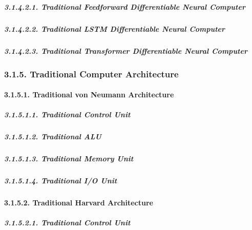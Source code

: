\documentclass[
]{article}
\begin{document}
\hypertarget{traditional-feedforward-differentiable-neural-computer-1}{%
\subparagraph{3.1.4.2.1. Traditional Feedforward Differentiable Neural
Computer}\label{traditional-feedforward-differentiable-neural-computer-1}}

\hypertarget{traditional-lstm-differentiable-neural-computer-1}{%
\subparagraph{3.1.4.2.2. Traditional LSTM Differentiable Neural
Computer}\label{traditional-lstm-differentiable-neural-computer-1}}

\hypertarget{traditional-transformer-differentiable-neural-computer-1}{%
\subparagraph{3.1.4.2.3. Traditional Transformer Differentiable Neural
Computer}\label{traditional-transformer-differentiable-neural-computer-1}}

\hypertarget{traditional-computer-architecture-1}{%
\subsubsection{3.1.5. Traditional Computer
Architecture}\label{traditional-computer-architecture-1}}

\hypertarget{traditional-von-neumann-architecture-1}{%
\paragraph{3.1.5.1. Traditional von Neumann
Architecture}\label{traditional-von-neumann-architecture-1}}

\hypertarget{traditional-control-unit-2}{%
\subparagraph{3.1.5.1.1. Traditional Control
Unit}\label{traditional-control-unit-2}}

\hypertarget{traditional-alu-2}{%
\subparagraph{3.1.5.1.2. Traditional ALU}\label{traditional-alu-2}}

\hypertarget{traditional-memory-unit-2}{%
\subparagraph{3.1.5.1.3. Traditional Memory
Unit}\label{traditional-memory-unit-2}}

\hypertarget{traditional-io-unit-2}{%
\subparagraph{3.1.5.1.4. Traditional I/O
Unit}\label{traditional-io-unit-2}}

\hypertarget{traditional-harvard-architecture-1}{%
\paragraph{3.1.5.2. Traditional Harvard
Architecture}\label{traditional-harvard-architecture-1}}

\hypertarget{traditional-control-unit-3}{%
\subparagraph{3.1.5.2.1. Traditional Control
Unit}\label{traditional-control-unit-3}}
\end{document}
